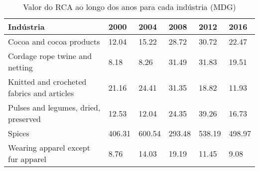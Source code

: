 \begin{table}
\centering
\caption{Valor do RCA ao longo dos anos para cada indústria (MDG)}
\label{tab:ex3-tempo-MDG}
\begin{tabular}{p{6cm}p{1.5cm}p{1.5cm}p{1.5cm}p{1.5cm}p{1.5cm}}
\toprule
                                 Indústria &   2000 &   2004 &   2008 &   2012 &   2016 \\
\midrule
                  Cocoa and cocoa products &  12.04 &  15.22 &  28.72 &  30.72 &  22.47 \\
            Cordage rope twine and netting &   8.18 &   8.26 &  31.49 &  31.83 &  19.51 \\
Knitted and crocheted fabrics and articles &  21.16 &  24.41 &  31.35 &  18.82 &  11.93 \\
      Pulses and legumes, dried, preserved &  12.53 &  12.04 &  24.35 &  39.26 &  16.73 \\
                                    Spices & 406.31 & 600.54 & 293.48 & 538.19 & 498.97 \\
        Wearing apparel except fur apparel &   8.76 &  14.03 &  19.19 &  11.45 &   9.08 \\
\bottomrule
\end{tabular}
\end{table}
